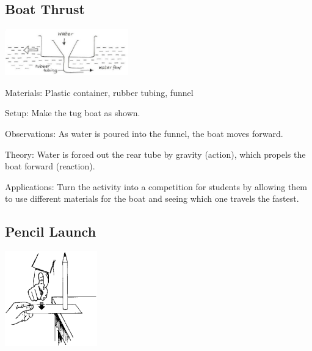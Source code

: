 \begin{multicols}{2}
\subsection{Boat Thrust}

\begin{center}
\includegraphics[width=0.4\textwidth]{./img/vso/boat-thrust.png}
\end{center}

\begin{description*}
\item[Materials:]{Plastic container, rubber tubing, funnel}
\item[Setup:]{Make the tug boat as shown. }
\item[Observations:]{As water is poured into the funnel, the boat moves forward.}
\item[Theory:]{Water is forced out the rear tube by gravity (action), which propels the boat forward (reaction).}
\item[Applications:]{Turn the activity into a competition for students by allowing them to use different materials for the boat and seeing which one travels the fastest.}
\end{description*}

\subsection{Pencil Launch}

\begin{center}
\includegraphics[width=0.3\textwidth]{./img/source/pencil-launch.png}
\end{center}


\end{multicols}
